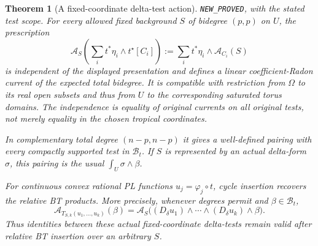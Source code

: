 \documentclass[11pt,a4paper]{article}
\numberwithin{equation}{section}
\newtheorem{theorem}{Theorem}[section]
\theoremstyle{definition}
\theoremstyle{remark}
\begin{document}
\begin{theorem}[A fixed-coordinate delta-test action]
\label{thm:r6-fixed-coordinate-delta-action}
\textnormal{\texttt{NEW\_PROVED}, with the stated test scope.}
For every allowed fixed background $S$ of bidegree $(p,p)$ on
$U$, the prescription
\begin{equation}
 \mathcal A_S\left(\sum_i t^*\eta_i\wedge t^\star[C_i]\right)
       :=\sum_i t^*\eta_i\wedge\mathcal A_{C_i}(S)
 \label{eq:r6-fixed-torus-action}
\end{equation}
is independent of the displayed presentation and defines a linear
coefficient-Radon current of the expected total bidegree.  It is
compatible with restriction from $\Omega$ to its real open subsets
and thus from $U$ to the corresponding saturated torus domains.
The independence is equality of original currents on all original
tests, not merely equality in the chosen tropical coordinates.

In complementary total degree $(n-p,n-p)$ it gives a well-defined
pairing with every compactly supported test in $\mathscr B_t$.
If $S$ is represented by an actual delta-form $\sigma$, this
pairing is the usual $\int_U\sigma\wedge\beta$.

For continuous convex rational PL functions $u_j=\varphi_j\circ t$,
cycle insertion recovers the relative BT products.  More precisely,
whenever degrees permit and $\beta\in\mathscr B_t$,
\[
 \mathcal A_{T_{S,k}(u_1,\ldots,u_k)}(\beta)
      =\mathcal A_S\bigl((D_\delta u_1)\wedge\cdots\wedge
                                  (D_\delta u_k)\wedge\beta\bigr).
\]
Thus identities between these actual fixed-coordinate delta-tests
remain valid after relative BT insertion over an arbitrary $S$.
\end{theorem}
\end{document}
